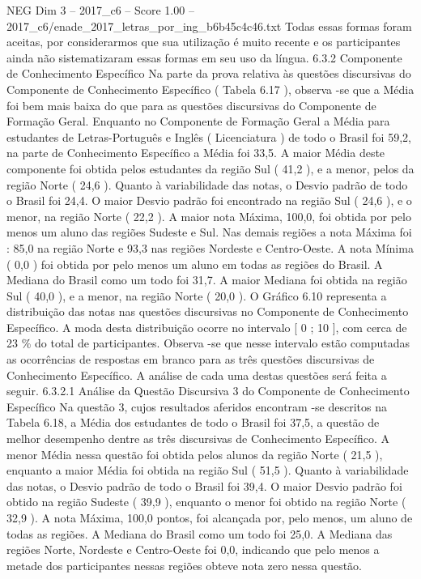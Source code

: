 \begin{textsample}{NEG Dim 3 – 2017\_c6 – Score 1.00 – 2017\_c6/enade\_2017\_letras\_por\_ing\_b6b45c4c46.txt}
Todas essas formas foram aceitas, por considerarmos que sua utilização é muito recente e os participantes ainda não sistematizaram essas formas em seu uso da língua. 6.3.2 Componente de Conhecimento Específico Na parte da prova relativa às questões discursivas do Componente de Conhecimento Específico ( Tabela 6.17 ), observa -se que a Média foi bem mais baixa do que para as questões discursivas do Componente de Formação Geral.
Enquanto no Componente de Formação Geral a Média para estudantes de Letras-Português e Inglês ( Licenciatura ) de todo o Brasil foi 59,2, na parte de Conhecimento Específico a Média foi 33,5.
A maior Média deste componente foi obtida pelos estudantes da região Sul ( 41,2 ), e a menor, pelos da região Norte ( 24,6 ).
Quanto à variabilidade das notas, o Desvio padrão de todo o Brasil foi 24,4.
O maior Desvio padrão foi encontrado na região Sul ( 24,6 ), e o menor, na região Norte ( 22,2 ).
A maior nota Máxima, 100,0, foi obtida por pelo menos um aluno das regiões Sudeste e Sul.
Nas demais regiões a nota Máxima foi : 85,0 na região Norte e 93,3 nas regiões Nordeste e Centro-Oeste.
A nota Mínima ( 0,0 ) foi obtida por pelo menos um aluno em todas as regiões do Brasil.
A Mediana do Brasil como um todo foi 31,7.
A maior Mediana foi obtida na região Sul ( 40,0 ), e a menor, na região Norte ( 20,0 ).
O Gráfico 6.10 representa a distribuição das notas nas questões discursivas no Componente de Conhecimento Específico.
A moda desta distribuição ocorre no intervalo [ 0 ; 10 ], com cerca de 23 \% do total de participantes.
Observa -se que nesse intervalo estão computadas as ocorrências de respostas em branco para as três questões discursivas de Conhecimento Específico.
A análise de cada uma destas questões será feita a seguir. 6.3.2.1 Análise da Questão Discursiva 3 do Componente de Conhecimento Específico Na questão 3, cujos resultados aferidos encontram -se descritos na Tabela 6.18, a Média dos estudantes de todo o Brasil foi 37,5, a questão de melhor desempenho dentre as três discursivas de Conhecimento Específico.
A menor Média nessa questão foi obtida pelos alunos da região Norte ( 21,5 ), enquanto a maior Média foi obtida na região Sul ( 51,5 ).
Quanto à variabilidade das notas, o Desvio padrão de todo o Brasil foi 39,4.
O maior Desvio padrão foi obtido na região Sudeste ( 39,9 ), enquanto o menor foi obtido na região Norte ( 32,9 ).
A nota Máxima, 100,0 pontos, foi alcançada por, pelo menos, um aluno de todas as regiões.
A Mediana do Brasil como um todo foi 25,0.
A Mediana das regiões Norte, Nordeste e Centro-Oeste foi 0,0, indicando que pelo menos a metade dos participantes nessas regiões obteve nota zero nessa questão.

\end{textsample}
